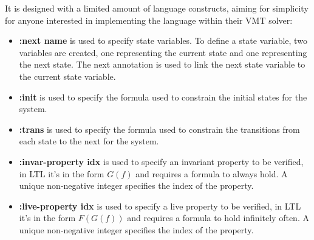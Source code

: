 It is designed with a limited amount of language constructs, aiming for simplicity for anyone interested in implementing the language within their VMT solver:
\begin{itemize}
    \item \textbf{:next name} is used to specify state variables. To define a state variable, two variables are created, one representing the current state and one representing the next state. The next annotation is used to link the next state variable to the current state variable.
    \item \textbf{:init} is used to specify the formula used to constrain the initial states for the system.
    \item \textbf{:trans} is used to specify the formula used to constrain the transitions from each state to the next for the system.
    \item \textbf{:invar-property idx} is used to specify an invariant property to be verified, in LTL it's in the form \begin{math} G (f) \end{math} and requires a formula to always hold.  A unique non-negative integer specifies the index of the property.
    \item \textbf{:live-property idx} is used to specify a live property to be verified, in LTL it's in the form \begin{math} F (G (f))\end{math} and requires a formula to hold infinitely often. A unique non-negative integer specifies the index of the property.
\end{itemize}
\cite{vmt-lib-paper} %

